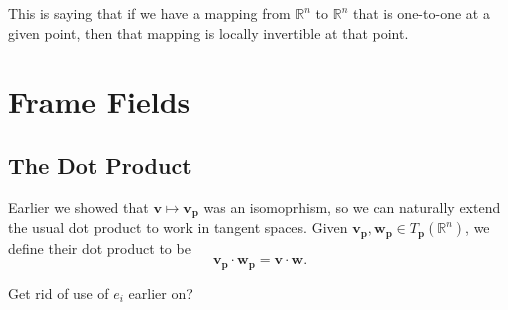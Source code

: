 \documentclass[10pt]{report}
\begin{document}
This is saying that if we have a mapping from $\mathbb{R}^n$ to $\mathbb{R}^n$ that is one-to-one at a given point, then that mapping is locally invertible at that point.


\chapter{Frame Fields}


\section{The Dot Product}

Earlier we showed that $\mathbf{v}\mapsto \mathbf{v}_{\mathbf{p}} $ was an isomoprhism, so we can naturally extend the usual dot product to work in tangent spaces. Given $\mathbf{v}_{\mathbf{p}}, \mathbf{w}_{\mathbf{p}} \in T_{\mathbf{p}}(\mathbb{R}^n)$, we define their dot product to be
\[
\mathbf{v}_{\mathbf{p}}\cdot \mathbf{w}_{\mathbf{p}} = \mathbf{v} \cdot \mathbf{w}.
\] 

{\color{red}Get rid of use of $e_i$ earlier on?}
\end{document}

